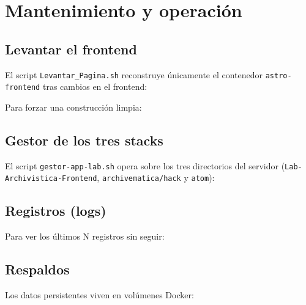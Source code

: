\documentclass[12pt,a4paper]{report}
\begin{document}
\chapter{Mantenimiento y operación}

\section{Levantar el frontend}

El script \texttt{Levantar\_Pagina.sh} reconstruye únicamente el contenedor
\texttt{astro-frontend} tras cambios en el frontend:


Para forzar una construcción limpia:


\section{Gestor de los tres stacks}

El script \texttt{gestor-app-lab.sh} opera sobre los tres directorios del
servidor (\texttt{Lab-Archivistica-Frontend}, \texttt{archivematica/hack} y
\texttt{atom}):


\section{Registros (logs)}


Para ver los últimos N registros sin seguir:


\section{Respaldos}

Los datos persistentes viven en volúmenes Docker:
\end{document}

